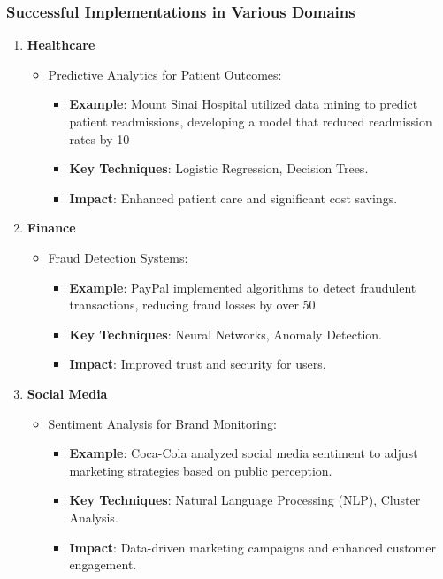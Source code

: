 \documentclass{beamer}
\begin{document}
\begin{frame}[fragile]
    \frametitle{Successful Implementations in Various Domains}
    \begin{enumerate}
        \item \textbf{Healthcare}
            \begin{itemize}
                \item Predictive Analytics for Patient Outcomes:
                    \begin{itemize}
                        \item \textbf{Example}: Mount Sinai Hospital utilized data mining to predict patient readmissions, developing a model that reduced readmission rates by 10%
                        \item \textbf{Key Techniques}: Logistic Regression, Decision Trees.
                        \item \textbf{Impact}: Enhanced patient care and significant cost savings.
                    \end{itemize}
            \end{itemize}
        \item \textbf{Finance}
            \begin{itemize}
                \item Fraud Detection Systems:
                    \begin{itemize}
                        \item \textbf{Example}: PayPal implemented algorithms to detect fraudulent transactions, reducing fraud losses by over 50%
                        \item \textbf{Key Techniques}: Neural Networks, Anomaly Detection.
                        \item \textbf{Impact}: Improved trust and security for users.
                    \end{itemize}
            \end{itemize}
        \item \textbf{Social Media}
            \begin{itemize}
                \item Sentiment Analysis for Brand Monitoring:
                    \begin{itemize}
                        \item \textbf{Example}: Coca-Cola analyzed social media sentiment to adjust marketing strategies based on public perception.
                        \item \textbf{Key Techniques}: Natural Language Processing (NLP), Cluster Analysis.
                        \item \textbf{Impact}: Data-driven marketing campaigns and enhanced customer engagement.
                    \end{itemize}
            \end{itemize}
    \end{enumerate}
\end{frame}
\end{document}
